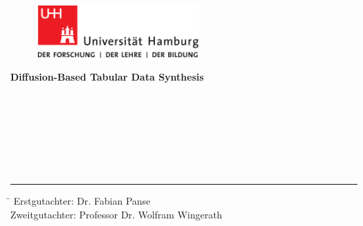 \begin{titlepage}

  \setcounter{page}{-1}

	\begin{figure}[h]
		\begin{minipage}[b]{62mm}
			\includegraphics[width=62mm]{images/unilogo}
		\end{minipage}
		\hspace{4cm}
	\end{figure}

	\vfill
	
	\begin{center}
		\vspace{14mm}
		\noindent \textbf{\huge
		  Diffusion-Based Tabular Data Synthesis
		}
		\vspace{60mm}	
	\end{center}
	
	\vfill
	\\
	\\
	\noindent{\rule{\textwidth}{0.4mm}}
	\\
	 \\
	 \\
	 \\
	\noindent \rule{\textwidth}{0.4mm} 
	\begin{tabbing}
	\hspace{8em} \=  \kill
	Erstgutachter: \> Dr. Fabian Panse \\
	Zweitgutachter: \> Professor Dr. Wolfram Wingerath \\
	\end{tabbing}

\end{titlepage}

